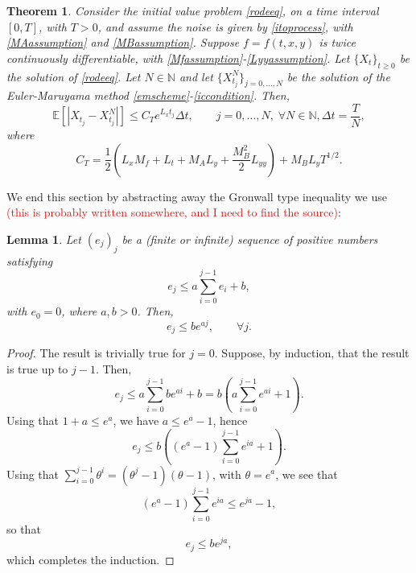 \documentclass[reqno,12pt]{amsart}
\theoremstyle{plain}%
\newtheorem{thm}{Theorem}[section]
\newtheorem{lem}{Lemma}[section]
\theoremstyle{definition}
\begin{document}
\begin{thm}
  \label{EMstrongorder1}
  Consider the initial value problem \eqref{rodeeq}, on a time interval $[0, T]$, with $T > 0$, and assume the noise is given by \eqref{itoprocess}, with \eqref{MAassumption} and \eqref{MBassumption}. Suppose $f=f(t, x, y)$ is twice continuously differentiable, with \eqref{Mfassumption}-\eqref{Lyyassumption}. Let $\{X_t\}_{t\geq 0}$ be the solution of \eqref{rodeeq}. Let $N\in \mathbb{N}$ and let $\{X_{t_j}^N\}_{j=0, \ldots, N}$ be the solution of the Euler-Maruyama method \eqref{emscheme}-\eqref{iccondition}. Then,
  \begin{equation}
  \mathbb{E}\left[ \left| X_{t_j} - X_{t_j}^N \right| \right] \leq C_T e^{L_x t_j} \Delta t, \qquad j = 0, \ldots, N, \;\forall N \in \mathbb{N},  \Delta t = \frac{T}{N},
\end{equation}
  where
  \begin{equation}
    C_T = \frac{1}{2}\left(L_x M_f + L_t + M_A L_y  + \frac{M_B^2}{2}L_{yy} \right) + M_B L_yT^{1/2}.
  \end{equation}
\end{thm}

We end this section by abstracting away the Gronwall type inequality we use \textcolor{red}{(this is probably written somewhere, and I need to find the source)}:
\begin{lem}
Let $(e_j)_j$ be a (finite or infinite) sequence of positive numbers satisfying
\begin{equation}
  \label{integralgronwall}
  e_j \leq a \sum_{i=0}^{j-1} e_i + b,
\end{equation}
with $e_0 = 0$, where $a, b > 0$. Then,
\begin{equation}
  \label{estimateintegralgronwall}
  e_j \leq b e^{aj}, \qquad \forall j.
\end{equation}
\end{lem}

\begin{proof}
  The result is trivially true for $j=0$. Suppose, by induction, that the result is true up to $j-1$. Then,
  $$
  e_j \leq a \sum_{i=0}^{j-1} be^{ai} + b = b \left(a \sum_{i=0}^{j-1} e^{ai} + 1\right).
  $$
  Using that $1 + a \leq e^a$, we have $a \leq e^a - 1$, hence
  $$
  e_j \leq b\left((e^a - 1)\sum_{i=0}^{j-1} e^{ia} + 1\right).
  $$
  Using that $\sum_{i=0}^{j-1} \theta^i = (\theta^j - 1)(\theta - 1)$, with $\theta = e^a$, we see that
  $$
  (e^a - 1)\sum_{i=0}^{j-1} e^{ia} \leq e^{ja} - 1,
  $$
  so that
  $$
  e_j \leq be^{ja},
  $$
  which completes the induction.
\end{proof}
\end{document}
